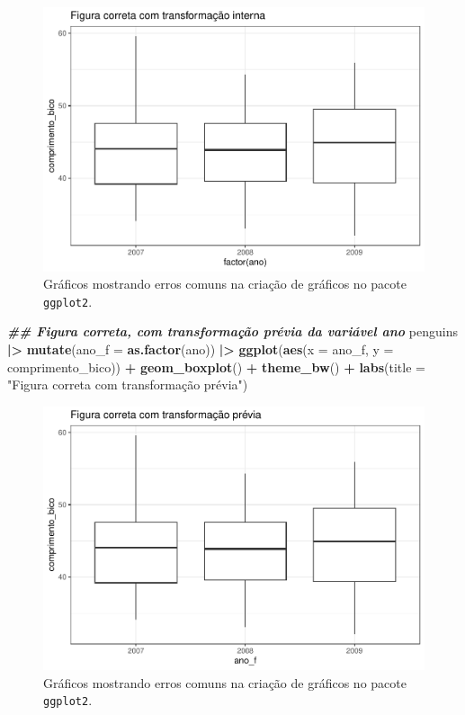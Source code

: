 \documentclass[
]{article}
\newenvironment{Shaded}{\begin{snugshade}}{\end{snugshade}}
\newcommand{\AttributeTok}[1]{\textcolor[rgb]{0.13,0.29,0.53}{#1}}
\newcommand{\DocumentationTok}[1]{\textcolor[rgb]{0.56,0.35,0.01}{\textbf{\textit{#1}}}}
\newcommand{\FunctionTok}[1]{\textcolor[rgb]{0.13,0.29,0.53}{\textbf{#1}}}
\newcommand{\NormalTok}[1]{#1}
\newcommand{\SpecialCharTok}[1]{\textcolor[rgb]{0.81,0.36,0.00}{\textbf{#1}}}
\newcommand{\StringTok}[1]{\textcolor[rgb]{0.31,0.60,0.02}{#1}}
\begin{document}
\begin{figure}
\centering
\includegraphics{epr_files/figure-latex/fig-plot-error-2.pdf}
\caption{\label{fig:fig-plot-error-2}Gráficos mostrando erros comuns na criação de gráficos no pacote \texttt{ggplot2}.}
\end{figure}

\begin{Shaded}
\begin{Highlighting}[]
\DocumentationTok{\#\# Figura correta, com transformação prévia da variável ano}
\NormalTok{penguins }\SpecialCharTok{|\textgreater{}}
    \FunctionTok{mutate}\NormalTok{(}\AttributeTok{ano\_f =} \FunctionTok{as.factor}\NormalTok{(ano)) }\SpecialCharTok{|\textgreater{}} 
    \FunctionTok{ggplot}\NormalTok{(}\FunctionTok{aes}\NormalTok{(}\AttributeTok{x =}\NormalTok{ ano\_f, }\AttributeTok{y =}\NormalTok{ comprimento\_bico)) }\SpecialCharTok{+}
    \FunctionTok{geom\_boxplot}\NormalTok{() }\SpecialCharTok{+} 
    \FunctionTok{theme\_bw}\NormalTok{() }\SpecialCharTok{+}
    \FunctionTok{labs}\NormalTok{(}\AttributeTok{title =} \StringTok{"Figura correta com transformação prévia"}\NormalTok{)}
\end{Highlighting}
\end{Shaded}

\begin{figure}
\centering
\includegraphics{epr_files/figure-latex/fig-plot-error-3.pdf}
\caption{\label{fig:fig-plot-error-3}Gráficos mostrando erros comuns na criação de gráficos no pacote \texttt{ggplot2}.}
\end{figure}
\end{document}
